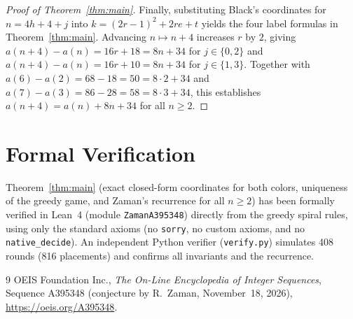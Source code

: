 \documentclass[11pt]{article}
\begin{document}
\begin{proof}[Proof of Theorem~\ref{thm:main}]
Finally, substituting Black's coordinates for $n = 4h + 4 + j$ into $k = (2r - 1)^2 + 2re + t$ yields the four label formulas in Theorem~\ref{thm:main}. Advancing $n \mapsto n + 4$ increases $r$ by $2$, giving $a(n + 4) - a(n) = 16r + 18 = 8n + 34$ for $j \in \{0, 2\}$ and $a(n + 4) - a(n) = 16r + 10 = 8n + 34$ for $j \in \{1, 3\}$. Together with $a(6) - a(2) = 68 - 18 = 50 = 8 \cdot 2 + 34$ and $a(7) - a(3) = 86 - 28 = 58 = 8 \cdot 3 + 34$, this establishes $a(n + 4) = a(n) + 8n + 34$ for all $n \ge 2$.
\end{proof}

\section{Formal Verification}

Theorem~\ref{thm:main} (exact closed-form coordinates for both colors, uniqueness of the greedy game, and Zaman's recurrence for all $n \ge 2$) has been formally verified in Lean~4 (module \texttt{ZamanA395348}) directly from the greedy spiral rules, using only the standard axioms (no \texttt{sorry}, no custom axioms, and no \texttt{native\_decide}). An independent Python verifier (\texttt{verify.py}) simulates 408 rounds (816 placements) and confirms all invariants and the recurrence.

\begin{thebibliography}{9}
OEIS Foundation Inc., \emph{The On-Line Encyclopedia of Integer Sequences}, Sequence A395348 (conjecture by R.~Zaman, November~18, 2026), \url{https://oeis.org/A395348}.
\end{thebibliography}
\end{document}
